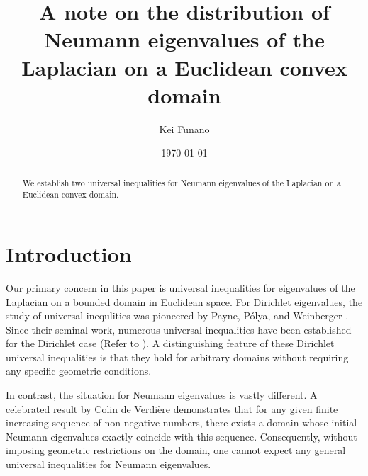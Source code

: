 \documentclass[12pt]{amsart}
\title[Distribution of Neumann eigenvalues]{A note on the distribution of Neumann eigenvalues of the Laplacian on a Euclidean convex domain}
\author{Kei Funano}
\date{\today}
\theoremstyle{plain}
\theoremstyle{remark}
\begin{document}
\maketitle

\begin{abstract}
We establish two universal inequalities for Neumann eigenvalues of the Laplacian on a Euclidean convex domain.
\end{abstract}






















\section{Introduction}


Our primary concern in this paper is universal inequalities for eigenvalues of the Laplacian on a bounded domain in Euclidean space. For Dirichlet eigenvalues, the study of universal inequlities was pioneered by Payne, P\'{o}lya, and Weinberger \cite{PPW}. Since their seminal work, numerous universal inequalities have been established for the Dirichlet case (Refer to \cite{A}). A distinguishing feature of these Dirichlet universal inequalities is that they hold for arbitrary domains without requiring any specific geometric conditions.

In contrast, the situation for Neumann eigenvalues is vastly different. A celebrated result by Colin de Verdi\`{e}re \cite{CdV} demonstrates that for any given finite increasing sequence of non-negative numbers, there exists a domain whose initial Neumann eigenvalues exactly coincide with this sequence. Consequently, without imposing geometric restrictions on the domain, one cannot expect any general universal inequalities for Neumann eigenvalues.
\end{document}
